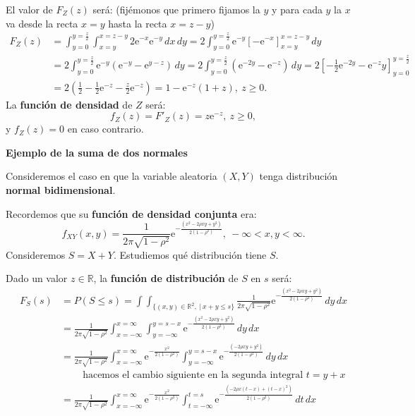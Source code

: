 \documentclass[]{book}
\begin{document}
El valor de \(F_Z(z)\) será: (fijémonos que primero fijamos la \(y\) y para cada \(y\) la \(x\) va desde la recta \(x=y\) hasta la recta \(x=z-y\))
\[
\begin{array}{rl}
F_Z(z) & =\int_{y=0}^{y=\frac{z}{2}}\int_{x=y}^{x=z-y}2 \mathrm{e}^{-x}\mathrm{e}^{-y}\, dx\, dy = 2 \int_{y=0}^{y=\frac{z}{2}} \mathrm{e}^{-y} \left[-\mathrm{e}^{-x}\right]_{x=y}^{x=z-y}\, dy \\ & = 2 \int_{y=0}^{y=\frac{z}{2}} \mathrm{e}^{-y} \left(\mathrm{e}^{-y}-\mathrm{e}^{y-z}\right)\, dy = 2 \int_{y=0}^{y=\frac{z}{2}} \left(\mathrm{e}^{-2y}-\mathrm{e}^{-z} \right)\, dy  = 2\left[-\frac{1}{2}\mathrm{e}^{-2y}-\mathrm{e}^{-z} y\right]_{y=0}^{y=\frac{z}{2}} \\ & = 2\left(\frac{1}{2}-\frac{1}{2}\mathrm{e}^{-z}-\frac{z}{2}\mathrm{e}^{-z}\right) = 1-\mathrm{e}^{-z}(1+z),\ z\geq 0.
\end{array}
\]
La \textbf{función de densidad} de \(Z\) será:
\[
f_Z(z)=F'_Z(z)=z \mathrm{e}^{-z},\ z\geq 0,
\]
y \(f_Z(z)=0\) en caso contrario.

\textbf{Ejemplo de la suma de dos normales}

Consideremos el caso en que la variable aleatoria \((X,Y)\) tenga distribución \textbf{normal bidimensional}.

Recordemos que su \textbf{función de densidad conjunta} era:
\[
f_{XY}(x,y)=\frac{1}{2\pi\sqrt{1-\rho^2}}\mathrm{e}^{-\frac{(x^2-2\rho xy+y^2)}{2(1-\rho^2)}},\ -\infty <x,y<\infty.
\]
Consideremos \(S=X+Y\). Estudiemos qué distribución tiene \(S\).

Dado un valor \(z\in\mathbb{R}\), la \textbf{función de distribución} de \(S\) en \(s\) será:
\[
\begin{array}{rl}
F_S(s) & =P(S\leq s)=\int\int_{\{(x,y)\in\mathbb{R}^2,\ |\ x+y\leq s\}}\frac{1}{2\pi\sqrt{1-\rho^2}}\mathrm{e}^{-\frac{(x^2-2\rho xy+y^2)}{2(1-\rho^2)}}\, dy\, dx \\ & =
\frac{1}{2\pi\sqrt{1-\rho^2}} \int_{x=-\infty}^{x=\infty}\int_{y=-\infty}^{y=s-x}\mathrm{e}^{-\frac{(x^2-2\rho xy+y^2)}{2(1-\rho^2)}}\, dy\, dx \\
& = \frac{1}{2\pi\sqrt{1-\rho^2}} \int_{x=-\infty}^{x=\infty} \mathrm{e}^{-\frac{x^2}{2(1-\rho^2)}} \int_{y=-\infty}^{y=s-x}\mathrm{e}^{-\frac{(-2\rho xy+y^2)}{2(1-\rho^2)}}\, dy\, dx  \\ &\ \qquad\mbox{hacemos el cambio siguiente en la segunda integral $t=y+x$}\\ & = \frac{1}{2\pi\sqrt{1-\rho^2}} \int_{x=-\infty}^{x=\infty} \mathrm{e}^{-\frac{x^2}{2(1-\rho^2)}} \int_{t=-\infty}^{t=s}\mathrm{e}^{-\frac{(-2\rho x(t-x)+(t-x)^2)}{2(1-\rho^2)}}\, dt\, dx 
\end{array}
\]
\end{document}
